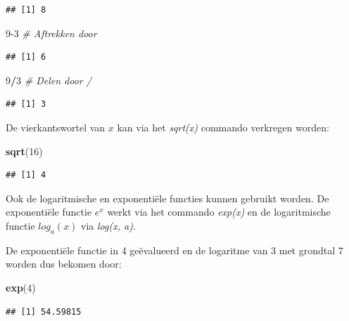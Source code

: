 \documentclass[
]{book}
\newenvironment{Shaded}{\begin{snugshade}}{\end{snugshade}}
\newcommand{\CommentTok}[1]{\textcolor[rgb]{0.56,0.35,0.01}{\textit{#1}}}
\newcommand{\DecValTok}[1]{\textcolor[rgb]{0.00,0.00,0.81}{#1}}
\newcommand{\FunctionTok}[1]{\textcolor[rgb]{0.13,0.29,0.53}{\textbf{#1}}}
\newcommand{\NormalTok}[1]{#1}
\newcommand{\SpecialCharTok}[1]{\textcolor[rgb]{0.81,0.36,0.00}{\textbf{#1}}}
\begin{document}
\begin{verbatim}
## [1] 8
\end{verbatim}

\begin{Shaded}
\begin{Highlighting}[]
\DecValTok{9{-}3} \CommentTok{\# Aftrekken door \textquotesingle{}{-}\textquotesingle{}}
\end{Highlighting}
\end{Shaded}

\begin{verbatim}
## [1] 6
\end{verbatim}

\begin{Shaded}
\begin{Highlighting}[]
\DecValTok{9}\SpecialCharTok{/}\DecValTok{3} \CommentTok{\# Delen door \textquotesingle{}/\textquotesingle{}}
\end{Highlighting}
\end{Shaded}

\begin{verbatim}
## [1] 3
\end{verbatim}

De vierkantswortel van \(x\) kan via het \emph{sqrt(x)} commando verkregen worden:

\begin{Shaded}
\begin{Highlighting}[]
\FunctionTok{sqrt}\NormalTok{(}\DecValTok{16}\NormalTok{)}
\end{Highlighting}
\end{Shaded}

\begin{verbatim}
## [1] 4
\end{verbatim}

Ook de logaritmische en exponentiële functies kunnen gebruikt worden. De
exponentiële functie \(e^x\) werkt via het commando \emph{exp(x)} en de logaritmische
functie \(log_a(x)\) via \emph{log(x, a)}.

De exponentiële functie in 4 geëvalueerd en de logaritme van 3 met grondtal 7 worden
dus bekomen door:

\begin{Shaded}
\begin{Highlighting}[]
\FunctionTok{exp}\NormalTok{(}\DecValTok{4}\NormalTok{)}
\end{Highlighting}
\end{Shaded}

\begin{verbatim}
## [1] 54.59815
\end{verbatim}
\end{document}
